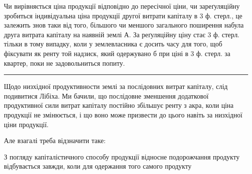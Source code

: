 Чи вирівняється ціна продукції відповідно до пересічної ціни, чи зареґуляційну
зробиться індивідуальна ціна продукції другої витрати капіталу в 3 ф. стерл.,
це залежить знов таки від того, більшого чи меншого загального поширення набула
друга витрата капіталу на наявній землі А. За реґуляційну ціну стає 3
ф. стерл. тільки в тому випадку, коли у землевласника є досить часу для того,
щоб фіксувати як ренту той надзиск, який одержувано б при ціні в 3 ф.
стерл. за квартер, поки не задовольниться попиту.

\pfbreak

Щодо низхідної продуктивности землі за послідовних витрат капіталу,
слід подивитися Лібіха. Ми бачили, що послідовне зменшення додаткової продуктивної
сили витрат капіталу постійно збільшує ренту з акра, коли ціна
продукції не змінюється, і що воно може призвести до цього навіть за низхідної
ціни продукції.

Але взагалі треба відзначити таке:

З    погляду капіталістичного способу продукції відносне подорожчання
продукту відбувається завжди, коли для одержання того самого продукту
\parbreak{}  %
